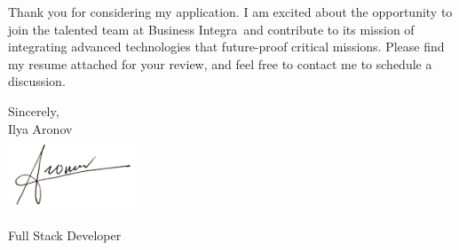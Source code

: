 \documentclass[11pt]{letter}
\def\myname{Ilya Aronov}
\def\mytitle{Full Stack Developer}
\def\companyName{Business Integra}
\def\companyMission{integrating advanced technologies that future-proof critical missions}
\begin{document}
Thank you for considering my application. I am excited about the opportunity to join the talented team at \companyName\, and contribute to its mission of \companyMission.
Please find my resume attached for your review, and feel free to contact me to schedule a discussion.


\vspace{0.1in}
\vfill

\begin{flushright}

\vspace{-0.1in}
Sincerely, \\
\myname\\

\includegraphics[width=1.5in]{signiture_no_background.png}

\vspace{-0.1in}
\mytitle

\end{flushright}
\end{document}
